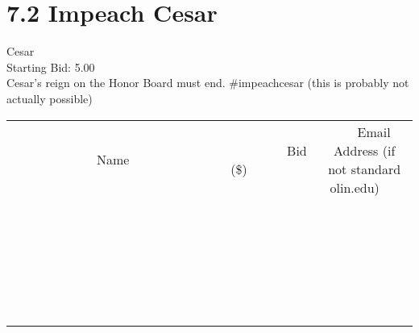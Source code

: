 \documentclass[11pt]{article}
\begin{document}
					\section*{7.2 Impeach Cesar}
					Cesar \\
					Starting Bid: 5.00 \\
					Cesar's reign on the Honor Board must end. \#impeachcesar (this is probably not actually possible) \\
					[6ex]
					\begin{tabular}{c c c}
						~~~~~~~~~~~~~Name~~~~~~~~~~~~~ & ~~~~~~~~~Bid (\$)~~~~~~~~~ & ~~~Email Address (if not standard olin.edu)~~~ \\
				
 & & \\
\hline
 & & \\
\hline
 & & \\
\hline
 & & \\
\hline
 & & \\
\hline
 & & \\
\hline
 & & \\
\hline
 & & \\
\hline
 & & \\
\hline
 & & \\
\hline
 & & \\
\hline
 & & \\
\hline
 & & \\
\hline
 & & \\
\hline
 & & \\
\hline
 & & \\
\hline
 & & \\
\hline
 & & \\
\hline
 & & \\
\hline
 & & \\
\hline
 & & \\
\hline
 & & \\
\hline
 & & \\
\hline
 & & \\
\hline
 & & \\
\hline
 & & \\
\hline
					\end{tabular}
					\clearpage
				
\end{document}

